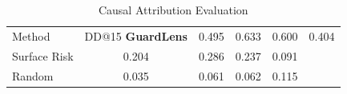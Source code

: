 \begin{table}[t]
\centering
\small
\caption{Causal Attribution Evaluation}
\label{tab:causal_eval}
\begin{tabular}{lcccc}
\toprule
Method & DD@15%
\midrule
\textbf{GuardLens} & 0.495 & 0.633 & 0.600 & 0.404 \\
Surface Risk & 0.204 & 0.286 & 0.237 & 0.091 \\
Random & 0.035 & 0.061 & 0.062 & 0.115 \\
\bottomrule
\end{tabular}
\end{table}